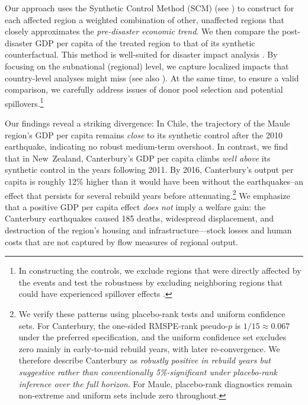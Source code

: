 \documentclass[12pt]{article}
\begin{document}
Our approach uses the Synthetic Control Method (SCM) (see \cite{abadie2021jel, abadie2010synthetic}) to construct for each affected region a weighted combination of other, unaffected regions that closely approximates the \textit{pre-disaster economic trend}. We then compare the post-disaster GDP per capita of the treated region to that of its synthetic counterfactual. This method is well-suited for disaster impact analysis \parencite{barone2014natural, coffman2012hurricane, rayamajhee2024shock}. By focusing on the subnational (regional) level, we capture localized impacts that country-level analyses might miss (see also \cite{boustan2020effect, farzanegan2025bam}). At the same time, to ensure a valid comparison, we carefully address issues of donor pool selection and potential spillovers.\footnote{In constructing the controls, we exclude regions that were directly affected by the events and test the robustness by excluding neighboring regions that could have experienced spillover effects \parencite{abadie2021jel}.}

Our findings reveal a striking divergence: In Chile, the trajectory of the Maule region's GDP per capita remains \textit{close} to its synthetic control after the 2010 earthquake, indicating no robust medium-term overshoot. In contrast, we find that in New Zealand, Canterbury’s GDP per capita climbs \textit{well above} its synthetic control in the years following 2011. By 2016, Canterbury’s output per capita is roughly 12\% higher than it would have been without the earthquakes--an effect that persists for several rebuild years before attenuating.\footnote{We verify these patterns using placebo-rank tests and uniform confidence sets. For Canterbury, the one-sided RMSPE-rank pseudo-$p$ is $1/15\approx0.067$ under the preferred specification, and the uniform confidence set excludes zero mainly in early-to-mid rebuild years, with later re-convergence. We therefore describe Canterbury as \emph{robustly positive in rebuild years but suggestive rather than conventionally 5\%-significant under placebo-rank inference over the full horizon}. For Maule, placebo-rank diagnostics remain non-extreme and uniform sets include zero throughout.} We emphasize that a positive GDP per capita effect \textit{does not} imply a welfare gain: the Canterbury earthquakes caused 185 deaths, widespread displacement, and destruction of the region's housing and infrastructure—stock losses and human costs that are not captured by flow measures of regional output.
\end{document}
